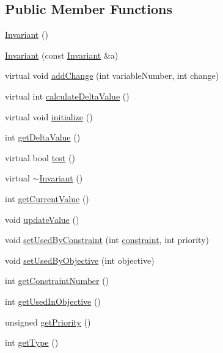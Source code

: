 \subsection*{Public Member Functions}
\begin{DoxyCompactItemize}
\item 
\hyperlink{class_invariant_aee61aac8e05fd3e6162b5b42655b4784}{Invariant} ()
\item 
\hyperlink{class_invariant_ac45b5d3cf54ef322c9827c603e4d1a56}{Invariant} (const \hyperlink{class_invariant}{Invariant} \&a)
\item 
virtual void \hyperlink{class_invariant_a76632dc09fe3537f159230620406fdff}{add\-Change} (int variable\-Number, int change)
\item 
virtual int \hyperlink{class_invariant_a4797e907bd38e68769962949b453ae7a}{calculate\-Delta\-Value} ()
\item 
virtual void \hyperlink{class_invariant_af04129a6e93870f87bc841db6475ae58}{initialize} ()
\item 
int \hyperlink{class_invariant_a4a5784dedbcafc641a927e47a5979b8f}{get\-Delta\-Value} ()
\item 
virtual bool \hyperlink{class_invariant_ab3fd6fa5c99ed9854756347a439e0fd9}{test} ()
\item 
virtual \hyperlink{class_invariant_a5e04ac8b0598cb050b485adebe0d5996}{$\sim$\-Invariant} ()
\item 
int \hyperlink{class_invariant_a570739630823019ab560dcf5ed5d9c79}{get\-Current\-Value} ()
\item 
void \hyperlink{class_invariant_ad6a0db294da40ee07bc432e4c082bdcd}{update\-Value} ()
\item 
void \hyperlink{class_invariant_a8c29176c35253050aabc33f43242c5b2}{set\-Used\-By\-Constraint} (int \hyperlink{_constants_8hpp_ab3a9f5ca3242dd173f530bb9f68fc611}{constraint}, int priority)
\item 
void \hyperlink{class_invariant_a5f3ca0104c32cbbf6b1f943b4691cc57}{set\-Used\-By\-Objective} (int objective)
\item 
int \hyperlink{class_invariant_aa8c83f6b8d3d1d907345d2784a7119ca}{get\-Constraint\-Number} ()
\item 
int \hyperlink{class_invariant_a77206bbdf0e95ac679787c18340c8ed7}{get\-Used\-In\-Objective} ()
\item 
unsigned \hyperlink{class_invariant_afff1e871c21c07ec683cced1733b9526}{get\-Priority} ()
\item 
int \hyperlink{class_invariant_a8b00f5d2bd3b5d656204ac3a3f051255}{get\-Type} ()

\end{DoxyCompactItemize}
